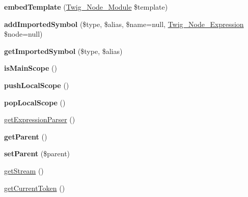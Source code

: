 \begin{DoxyCompactItemize}
\item 
{\bfseries embed\+Template} (\hyperlink{class_twig___node___module}{Twig\+\_\+\+Node\+\_\+\+Module} \$template)\hypertarget{class_twig___parser_af8d7eaf0c7174a199d3caa4bc2f5af4d}{}\label{class_twig___parser_af8d7eaf0c7174a199d3caa4bc2f5af4d}

\item 
{\bfseries add\+Imported\+Symbol} (\$type, \$alias, \$name=null, \hyperlink{class_twig___node___expression}{Twig\+\_\+\+Node\+\_\+\+Expression} \$node=null)\hypertarget{class_twig___parser_aa27264a7481f89b0004fcc3b72293254}{}\label{class_twig___parser_aa27264a7481f89b0004fcc3b72293254}

\item 
{\bfseries get\+Imported\+Symbol} (\$type, \$alias)\hypertarget{class_twig___parser_ae8b7646641e0f8417ecc89402fcd0e2f}{}\label{class_twig___parser_ae8b7646641e0f8417ecc89402fcd0e2f}

\item 
{\bfseries is\+Main\+Scope} ()\hypertarget{class_twig___parser_a9018e83fae9f837d042fa54d713626cc}{}\label{class_twig___parser_a9018e83fae9f837d042fa54d713626cc}

\item 
{\bfseries push\+Local\+Scope} ()\hypertarget{class_twig___parser_afd728d8c584c248c8bf098a8b0e162db}{}\label{class_twig___parser_afd728d8c584c248c8bf098a8b0e162db}

\item 
{\bfseries pop\+Local\+Scope} ()\hypertarget{class_twig___parser_a516a18d30a1aa1a09e19d47f3f391c66}{}\label{class_twig___parser_a516a18d30a1aa1a09e19d47f3f391c66}

\item 
\hyperlink{class_twig___parser_ace16df8b342fd0e63669db2a8ea3b060}{get\+Expression\+Parser} ()
\item 
{\bfseries get\+Parent} ()\hypertarget{class_twig___parser_a95ecaee3537b1ad29b04ef383a57bbae}{}\label{class_twig___parser_a95ecaee3537b1ad29b04ef383a57bbae}

\item 
{\bfseries set\+Parent} (\$parent)\hypertarget{class_twig___parser_a3b949fc022c82eb25e8650e0e01404fa}{}\label{class_twig___parser_a3b949fc022c82eb25e8650e0e01404fa}

\item 
\hyperlink{class_twig___parser_a3e5834ff3daeecd091712270886a16fb}{get\+Stream} ()
\item 
\hyperlink{class_twig___parser_aa8c70f7e7e5c449b03703ff558a026a5}{get\+Current\+Token} ()
\end{DoxyCompactItemize}
